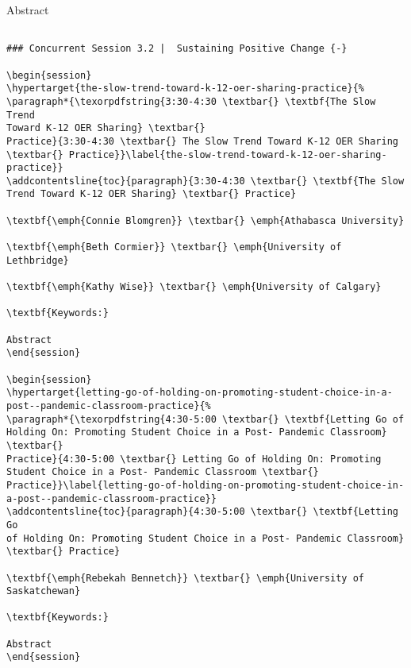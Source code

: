 \documentclass[
]{book}
\begin{document}
Abstract

\begin{verbatim}

### Concurrent Session 3.2 |  Sustaining Positive Change {-}

\begin{session}
\hypertarget{the-slow-trend-toward-k-12-oer-sharing-practice}{%
\paragraph*{\texorpdfstring{3:30-4:30 \textbar{} \textbf{The Slow Trend
Toward K-12 OER Sharing} \textbar{}
Practice}{3:30-4:30 \textbar{} The Slow Trend Toward K-12 OER Sharing \textbar{} Practice}}\label{the-slow-trend-toward-k-12-oer-sharing-practice}}
\addcontentsline{toc}{paragraph}{3:30-4:30 \textbar{} \textbf{The Slow
Trend Toward K-12 OER Sharing} \textbar{} Practice}

\textbf{\emph{Connie Blomgren}} \textbar{} \emph{Athabasca University}

\textbf{\emph{Beth Cormier}} \textbar{} \emph{University of Lethbridge}

\textbf{\emph{Kathy Wise}} \textbar{} \emph{University of Calgary}

\textbf{Keywords:}

Abstract
\end{session}

\begin{session}
\hypertarget{letting-go-of-holding-on-promoting-student-choice-in-a-post--pandemic-classroom-practice}{%
\paragraph*{\texorpdfstring{4:30-5:00 \textbar{} \textbf{Letting Go of
Holding On: Promoting Student Choice in a Post- Pandemic Classroom}
\textbar{}
Practice}{4:30-5:00 \textbar{} Letting Go of Holding On: Promoting Student Choice in a Post- Pandemic Classroom \textbar{} Practice}}\label{letting-go-of-holding-on-promoting-student-choice-in-a-post--pandemic-classroom-practice}}
\addcontentsline{toc}{paragraph}{4:30-5:00 \textbar{} \textbf{Letting Go
of Holding On: Promoting Student Choice in a Post- Pandemic Classroom}
\textbar{} Practice}

\textbf{\emph{Rebekah Bennetch}} \textbar{} \emph{University of
Saskatchewan}

\textbf{Keywords:}

Abstract
\end{session}


\end{verbatim}
\end{document}
